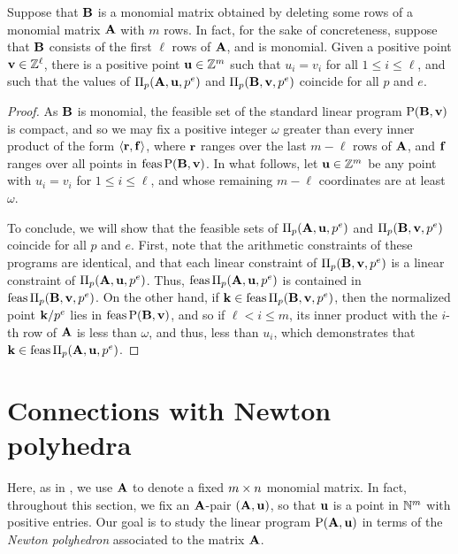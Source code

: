 \documentclass{amsart}
\begin{document}
\begin{lemma} 
   \label{lifted-programs: L}
   Suppose that $\mathbf{B}$ is a monomial matrix obtained by deleting some rows of a monomial matrix $\mathbf{A}$ with $m$ rows.
   In fact, for the sake of concreteness, suppose that $\mathbf{B}$ consists of the first $\ell$ rows of $\mathbf{A}$, and is monomial.
   Given a positive point $\mathbf{v} \in \mathbb{Z}^{\ell}$, there is a positive point $\mathbf{u} \in \mathbb{Z}^{m}$ such that $u_i = v_i$ for all $1 \leq i \leq \ell$, and such that the values of $\Pi_p(\mathbf{A}, \mathbf{u}, p^e)$ and $\Pi_p(\mathbf{B}, \mathbf{v}, p^e)$ coincide for all $p$ and $e$.
\end{lemma}

\begin{proof}  As $\mathbf{B}$ is monomial, the feasible set of the standard linear program $\mathrm{P}(\mathbf{B}, \mathbf{v})$ is compact, and so we may fix a positive integer $\omega$ greater than every inner product of the form $\langle \mathbf{r}, \mathbf{f} \rangle$, where $\mathbf{r}$ ranges over the last $m-\ell$ rows of $\mathbf{A}$, and $\mathbf{f}$ ranges over all points in $\operatorname{feas} \mathrm{P}(\mathbf{B},\mathbf{v})$. In what follows, let $\mathbf{u} \in \mathbb{Z}^{m}$ be any point with $u_i = v_i$ for $1 \leq i \leq \ell$, and whose remaining $m-\ell$ coordinates are at least $\omega$. 

To conclude, we will show that the feasible sets of $\Pi_p(\mathbf{A}, \mathbf{u}, p^e)$ and $\Pi_p(\mathbf{B}, \mathbf{v}, p^e)$ coincide for all $p$ and $e$.  First, note that the arithmetic constraints of these programs are identical, and that each linear constraint of $\Pi_p(\mathbf{B}, \mathbf{v}, p^e)$ is a linear constraint of $\Pi_p(\mathbf{A}, \mathbf{u},p^e)$.  Thus, $\operatorname{feas} \Pi_p(\mathbf{A}, \mathbf{u}, p^e)$ is contained in $\operatorname{feas} \Pi_p(\mathbf{B}, \mathbf{v}, p^e)$.  On the other hand, if $\mathbf{k} \in \operatorname{feas} \Pi_p(\mathbf{B}, \mathbf{v}, p^e)$, then the normalized point $\mathbf{k}/p^e$ lies in $\operatorname{feas} \mathrm{P}(\mathbf{B}, \mathbf{v})$, and so if $\ell < i \leq m$, its inner product with the $i$-th row of $\mathbf{A}$ is less than $\omega$, and thus, less than $u_i$, which demonstrates that $\mathbf{k} \in \operatorname{feas} \Pi_p(\mathbf{A}, \mathbf{u}, p^e)$.  
\end{proof}


\section{Connections with Newton polyhedra}
\label{s: newton}
Here, as in ,  we use $\mathbf{A}$ to denote a fixed $m \times n$ monomial matrix.
In fact, throughout this section, we fix an $\mathbf{A}$-pair $(\mathbf{A}, \mathbf{u})$, so that $\mathbf{u}$ is a point in $\mathbb{N}^m$ with positive entries.
Our goal is to study the linear program $\mathrm{P}(\mathbf{A}, \mathbf{u})$ in terms of the \emph{Newton polyhedron} associated to the matrix $\mathbf{A}$.
\end{document}
